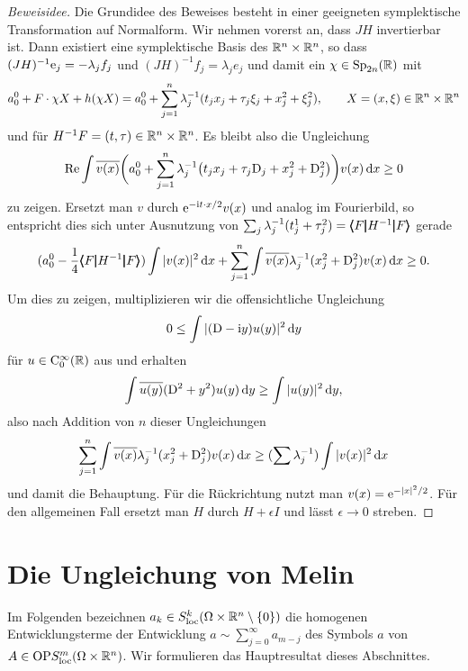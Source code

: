 \begin{proof}[Beweisidee]
Die Grundidee des Beweises besteht in einer geeigneten symplektische Transformation auf Normalform. Wir nehmen vorerst an, dass $JH$ invertierbar ist. Dann existiert eine symplektische Basis des $\mathbb R^n\times\mathbb R^n$, so dass $(JH)^{-1}\mathrm e_j = - \lambda_j f_j$ und $(JH)^{-1} f_j = \lambda_j e_j$ und damit ein $\chi\in\mathrm{Sp}_{2n}(\mathbb R)$ mit
\begin{equation}
    a_0^0 + F\cdot \chi X + h(\chi X) = a_0^0 + \sum_{j=1}^n \lambda_j^{-1} (t_j x_j  + \tau_j\xi_j + x_j^2 + \xi_j^2 ),\qquad X=(x,\xi)\in\mathbb R^n\times\mathbb R^n
\end{equation}
und für $H^{-1} F = (t,\tau)\in\mathbb R^n\times\mathbb R^n$. Es bleibt also die Ungleichung
\begin{equation}
  \operatorname{Re} \int \overline{v(x)} \bigg( a_0^0 + \sum_{j=1}^n \lambda_j^{-1} \big(  t_j x_j +\tau_j \mathrm D_j +x_j^2 + \mathrm D_j^2\big)\bigg) v(x) \,\mathrm d x \ge 0
\end{equation}
zu zeigen. Ersetzt man $v$ durch $\mathrm e^{-\mathrm i t \cdot x /2 } v(x)$ und analog im Fourierbild, so entspricht dies sich unter Ausnutzung von $\sum_j \lambda_j^{-1} (t_j^1 + \tau_j^2)= \pmb\langle F\pmb|H^{-1}\pmb|F\pmb\rangle$ gerade
\begin{equation}
   (a_0^0 - \frac14 \pmb\langle F\pmb|H^{-1}\pmb|F\pmb\rangle) \int |v(x)|^2 \,\mathrm d x + \sum_{j=1}^n  \int \overline{v(x)} \lambda_j^{-1} (x_j^2 + \mathrm D_j^2) v(x) \,\mathrm d x \ge 0.
\end{equation} 
Um dies zu zeigen, multiplizieren wir die offensichtliche Ungleichung
\begin{equation}
  0 \le \int |(\mathrm D - \mathrm i  y)u(y)|^2 \,\mathrm d y
\end{equation}
für $u\in\mathrm C_0^\infty(\mathbb R)$ aus und erhalten
\begin{equation}
    \int \overline{u(y)} (\mathrm D^2 + y^2) u(y) \,\mathrm d y \ge  \int |u(y)|^2 \,\mathrm d y,
\end{equation}
also nach Addition von $n$ dieser Ungleichungen
\begin{equation}
 \sum_{j=1}^n  \int \overline{v(x)} \lambda_j^{-1} (x_j^2 + \mathrm D_j^2) v(x) \,\mathrm d x
 \ge (\sum \lambda_j^{-1}) \int |v(x)|^2 \,\mathrm d x
 \end{equation}
 und damit die Behauptung. Für die Rückrichtung nutzt man $v(x) = \mathrm e^{-|x|^2/2}$. Für den allgemeinen Fall ersetzt man $H$ durch $H+\epsilon I$ und lässt $\epsilon\to0$ streben.
\end{proof}


\section{Die Ungleichung von Melin}
Im Folgenden bezeichnen $a_k\in S^{k}_\mathrm{loc}(\Omega\times\mathbb R^n\setminus\{0\})$ die homogenen Entwicklungsterme der Entwicklung $a\sim\sum_{j=0}^\infty a_{m-j}$ des Symbols $a$ von $A\in\mathrm{OP}S^{m}_{\rm loc}(\Omega\times\mathbb R^n)$. Wir formulieren das Hauptresultat dieses Abschnittes. 

